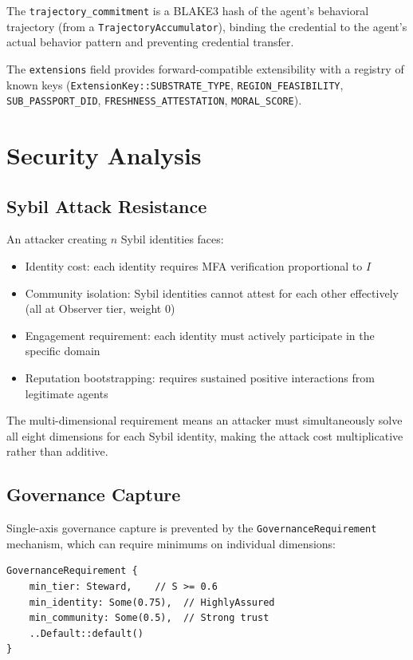 \documentclass[11pt,twocolumn]{article}
\begin{document}
The \texttt{trajectory\_commitment} is a BLAKE3 hash of the agent's
behavioral trajectory (from a \texttt{TrajectoryAccumulator}), binding
the credential to the agent's actual behavior pattern and preventing
credential transfer.

The \texttt{extensions} field provides forward-compatible extensibility
with a registry of known keys (\texttt{ExtensionKey::SUBSTRATE\_TYPE},
\texttt{REGION\_FEASIBILITY}, \texttt{SUB\_PASSPORT\_DID},
\texttt{FRESHNESS\_ATTESTATION}, \texttt{MORAL\_SCORE}).

\section{Security Analysis}

\subsection{Sybil Attack Resistance}

An attacker creating $n$ Sybil identities faces:
\begin{itemize}[nosep]
  \item Identity cost: each identity requires MFA verification proportional to $I$
  \item Community isolation: Sybil identities cannot attest for each other
    effectively (all at Observer tier, weight 0)
  \item Engagement requirement: each identity must actively participate in
    the specific domain
  \item Reputation bootstrapping: requires sustained positive interactions
    from legitimate agents
\end{itemize}

The multi-dimensional requirement means an attacker must simultaneously
solve all eight dimensions for each Sybil identity, making the attack cost
multiplicative rather than additive.

\subsection{Governance Capture}

Single-axis governance capture is prevented by the \texttt{GovernanceRequirement}
mechanism, which can require minimums on individual dimensions:

\begin{lstlisting}
GovernanceRequirement {
    min_tier: Steward,    // S >= 0.6
    min_identity: Some(0.75),  // HighlyAssured
    min_community: Some(0.5),  // Strong trust
    ..Default::default()
}
\end{lstlisting}
\end{document}
